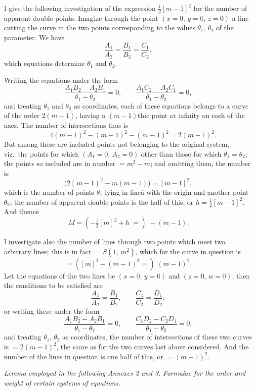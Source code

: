 \documentclass[11pt,a4paper]{article}
\begin{document}
\medskip

I give the following investigation of the expression $\tfrac{1}{2}[m-1]^2$ for the number of apparent double points. Imagine through the point $(x=0,\,y=0,\,z=0)$ a line cutting the curve in the two points corresponding to the values $\theta_1,\,\theta_2$ of the parameter. We have
\[
\frac{A_1}{A_2} = \frac{B_1}{B_2} = \frac{C_1}{C_2},
\]
which equations determine $\theta_1$ and $\theta_2$.

\medskip

Writing the equations under the form
\[
\frac{A_1 B_2 - A_2 B_1}{\theta_1 - \theta_2} = 0,\qquad \frac{A_1 C_2 - A_2 C_1}{\theta_1 - \theta_2} = 0,
\]
and treating $\theta_1$ and $\theta_2$ as coordinates, each of these equations belongs to a curve of the order $2(m-1)$, having a $(m-1)$thic point at infinity on each of the axes. The number of intersections thus is
\[
= 4(m-1)^2 - (m-1)^2 - (m-1)^2 = 2(m-1)^2.
\]
But among these are included points not belonging to the original system, viz.\ the points for which $(A_1 = 0,\,A_2 = 0)$ other than those for which $\theta_1 = \theta_2$; the points so included are in number $= m^2 - m$; and omitting them, the number is
\[
\bigl(2(m-1)^2 - m(m-1)\bigr) = [m-1]^2,
\]
which is the number of points $\theta_1$ lying in line\'a with the origin and another point $\theta_2$; the number of apparent double points is the half of this, or $h = \tfrac{1}{2}[m-1]^2$. And thence
\[
M = (-\tfrac{1}{2}[m]^2 + h\;=)\;-(m-1).
\]

\medskip

I investigate also the number of lines through two points which meet two arbitrary lines; this is in fact $= S(1,\,m^2)$, which for the curve in question is
\[
= ([m]^2 - (m-1)^2 =)\;(m-1)^2.
\]
Let the equations of the two lines be $(x=0,\,y=0)$ and $(z=0,\,w=0)$; then the conditions to be satisfied are
\[
\frac{A_1}{A_2} = \frac{B_1}{B_2},\qquad \frac{C_1}{C_2} = \frac{D_1}{D_2};
\]
or writing these under the form
\[
\frac{A_1 B_2 - A_2 B_1}{\theta_1 - \theta_2} = 0,\qquad \frac{C_1 D_2 - C_2 D_1}{\theta_1 - \theta_2} = 0,
\]
and treating $\theta_1$, $\theta_2$ as coordinates, the number of intersections of these two curves is $= 2(m-1)^2$, the same as for the two curves last above considered. And the number of the lines in question is one half of this, or $= (m-1)^2$.

\bigskip

\begin{center}
\textit{Lemma employed in the following Annexes 2 and 3. Formulae for the order and weight of certain systems of equations.}
\end{center}
\end{document}
